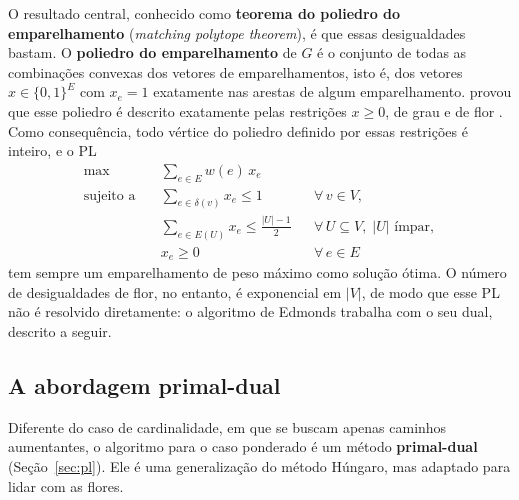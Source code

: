 O resultado central, conhecido como \textbf{teorema do poliedro do emparelhamento} (\textit{matching polytope theorem}), é que essas desigualdades bastam. O \textbf{poliedro do emparelhamento} de $G$ é o conjunto de todas as combinações convexas dos vetores de emparelhamentos, isto é, dos vetores $x \in \{0, 1\}^E$ com $x_e = 1$ exatamente nas arestas de algum emparelhamento.  provou que esse poliedro é descrito exatamente pelas restrições $x \ge 0$, de grau e de flor \cite[Corolário 25.1a]{schrijver}. Como consequência, todo vértice do poliedro definido por essas restrições é inteiro, e o PL
\begin{equation}
    \begin{aligned}
        \max \quad & \sum_{e \in E} w(e)\, x_e \\
        \text{sujeito a} \quad & \sum_{e \in \delta(v)} x_e \le 1 && \forall\, v \in V, \\
        & \sum_{e \in E(U)} x_e \le \frac{|U| - 1}{2} && \forall\, U \subseteq V, \; |U| \text{ ímpar}, \\
        & x_e \ge 0 && \forall\, e \in E
    \end{aligned}
    \label{eq:emp_pl_flor}
\end{equation}
tem sempre um emparelhamento de peso máximo como solução ótima. O número de desigualdades de flor, no entanto, é exponencial em $|V|$, de modo que esse PL não é resolvido diretamente: o algoritmo de Edmonds trabalha com o seu dual, descrito a seguir.

\subsection{A abordagem primal-dual}

Diferente do caso de cardinalidade, em que se buscam apenas caminhos aumentantes, o algoritmo para o caso ponderado é um método \textbf{primal-dual} (Seção~\ref{sec:pl}). Ele é uma generalização do método Húngaro, mas adaptado para lidar com as flores.

